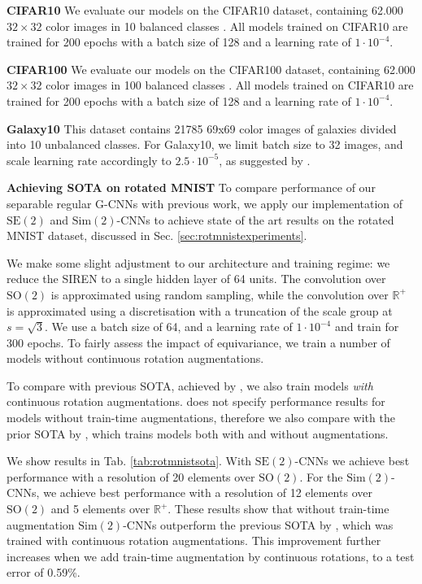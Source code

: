 \documentclass[nohyperref]{article}
\theoremstyle{plain}
\theoremstyle{definition}
\theoremstyle{remark}
\newcommand{\R}{\mathbb{R}}
\begin{document}
\textbf{CIFAR10} We evaluate our models on the CIFAR10 dataset, containing 62.000 $32\times32$ color images in 10 balanced classes \citep{krizhevsky2009learning}. All models trained on CIFAR10 are trained for 200 epochs with a batch size of 128 and a learning rate of $1 \cdot 10^{-4}$.

\textbf{CIFAR100} We evaluate our models on the CIFAR100 dataset, containing 62.000 $32\times32$ color images in 100 balanced classes \citep{krizhevsky2009learning}. All models trained on CIFAR10 are trained for 200 epochs with a batch size of 128 and a learning rate of $1 \cdot 10^{-4}$.

\textbf{Galaxy10} This dataset contains 21785 69x69 color images of galaxies divided into 10 unbalanced classes. For Galaxy10, we limit batch size to 32 images, and scale learning rate accordingly to $2.5\cdot10^{-5}$, as suggested by \citet{goyal2017accurate}.

\textbf{Achieving SOTA on rotated MNIST}\label{app:rotmnistsota}
To compare performance of our separable regular G-CNNs with previous work, we apply our implementation of $\mathrm{SE(2)}$ and $\mathrm{Sim(2)}$-CNNs to achieve state of the art results on the rotated MNIST dataset, discussed in Sec. \ref{sec:rotmnistexperiments}.

We make some slight adjustment to our architecture and training regime: we reduce the SIREN to a single hidden layer of 64 units. The convolution over $\mathrm{SO(2)}$ is approximated using random sampling, while the convolution over $\R^+$ is approximated using a discretisation with a truncation of the scale group at $s=\sqrt{3}$. We use a batch size of 64, and a learning rate of $1\cdot 10^{-4}$ and train for 300 epochs. To fairly assess the impact of equivariance, we train a number of models without continuous rotation augmentations.

To compare with previous SOTA, achieved by \citet{weiler2019general}, we also train models \textit{with} continuous rotation augmentations. \citet{weiler2019general} does not specify performance results for models without train-time augmentations, therefore we also compare with the prior SOTA by \citet{weiler2018learning}, which trains models both with and without augmentations.

We show results in Tab. \ref{tab:rotmnistsota}. With $\mathrm{SE(2)}$-CNNs we achieve best performance with a resolution of 20 elements over $\mathrm{SO(2)}$. For the $\mathrm{Sim(2)}$-CNNs, we achieve best performance with a resolution of 12 elements over $\mathrm{SO(2)}$ and 5 elements over $\mathrm{\R}^+$. These results show that without train-time augmentation $\mathrm{Sim(2)}$-CNNs outperform the previous SOTA by \citet{weiler2019general}, which was trained with continuous rotation augmentations. This improvement further increases when we add train-time augmentation by continuous rotations, to a test error of 0.59\%.
\end{document}

